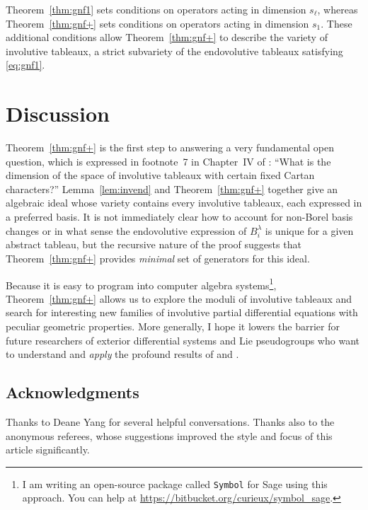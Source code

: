 \documentclass[pdftex]{sigma}
\numberwithin{equation}{section}
\begin{document}
Theorem~\ref{thm:gnf1} sets conditions on operators acting in dimension
$s_\ell$, whereas Theorem~\ref{thm:gnf+} sets conditions on operators acting in
dimension $s_1$. These additional conditions allow Theorem~\ref{thm:gnf+} to describe the
variety of involutive tableaux, a strict subvariety of the endovolutive tableaux satisfying \eqref{eq:gnf1}.



\section{Discussion}

Theorem~\ref{thm:gnf+} is the f\/irst step to answering a very fundamental open
question, which is expressed in footnote~7 in Chapter~IV of \cite{BCGGG}:
``What is the dimension of the space of involutive tableaux with certain f\/ixed
Cartan characters?''  Lemma~\ref{lem:invend} and Theorem~\ref{thm:gnf+}
together give an algebraic ideal whose variety contains every involutive
tableaux, each expressed in a preferred basis.  It is not immediately clear how to
account for non-Borel basis changes or in what sense the endovolutive expression
of $B^\lambda_i$ is unique for a given abstract tableau, but the recursive
nature of the proof suggests that Theorem~\ref{thm:gnf+} provides
\emph{minimal} set of generators for this ideal.

Because it is easy to program into computer algebra systems\footnote{I am
writing an open-source package called \texttt{Symbol} for Sage using this
approach.  You can help at \url{https://bitbucket.org/curieux/symbol_sage}.},
Theorem~\ref{thm:gnf+} allows us to explore the moduli of involutive tableaux
and search for interesting new families of involutive partial dif\/ferential
equations with peculiar geometric properties.  More generally, I hope it
lowers the barrier for future researchers of exterior dif\/ferential systems and Lie
pseudogroups who want to understand and \emph{apply} the profound results
of \cite{Quillen1964} and \cite{Guillemin1968}.

\subsection*{Acknowledgments}
Thanks to Deane Yang for several helpful conversations.  Thanks also to the
anonymous referees, whose suggestions improved the style and focus of this
article signif\/icantly.
\end{document}
